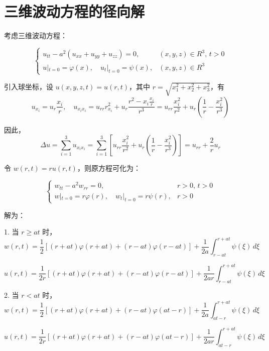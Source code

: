 \section{三维波动方程的径向解}


考虑三维波动方程：

\[
\begin{cases}
u_{tt} - a^2(u_{xx} + u_{yy} + u_{zz}) = 0, & (x, y, z) \in R^3, \, t > 0 \\
u|_{t=0} = \varphi(x), \quad u_t|_{t=0} = \psi(x), & (x, y, z) \in R^3
\end{cases}
\]

引入球坐标，设 $u(x, y, z, t) = u(r, t)$，其中 $r = \sqrt{x_1^2 + x_2^2 + x_3^2}$，有
$$
u_{x_i} = u_r \frac{x_i}{r}, \quad u_{x_ix_i} = u_{rr} r_{x_i}^2 + u_r \frac{r^2 - x_i \frac{x_i}{r}}{r^3} = u_{rr} \frac{x_i^2}{r^2} + u_r \left( \frac{1}{r} - \frac{x_i^2}{r^3} \right)
$$

因此，
$$
\Delta u = \sum_{i=1}^3 u_{x_ix_i} = \sum_{i=1}^3 \left[ u_{rr} \frac{x_i^2}{r^2} + u_r \left( \frac{1}{r} - \frac{x_i^2}{r^3} \right) \right] = u_{rr} + \frac{2}{r} u_r
$$

令 $w(r, t) = r u(r, t)$，则原方程可化为：

\[
\begin{cases}
w_{tt} - a^2 w_{rr} = 0, & r > 0, \, t > 0 \\
w|_{t=0} = r \varphi(r), \quad w_t|_{t=0} = r \psi(r), & r > 0
\end{cases}
\]

解为：

1. 当 $r \geq at$ 时，
   \[
   w(r, t) = \frac{1}{2} \left[ (r+at) \varphi(r+at) + (r-at) \varphi(r-at) \right] + \frac{1}{2a} \int_{r-at}^{r+at} \psi(\xi) \, d\xi
   \]

   \[
   u(r, t) = \frac{1}{2r} \left[ (r+at) \varphi(r+at) + (r-at) \varphi(r-at) \right] + \frac{1}{2ar} \int_{r-at}^{r+at} \psi(\xi) \, d\xi
   \]

2. 当 $r < at$ 时，
   \[
   w(r, t) = \frac{1}{2} \left[ (r+at) \varphi(r+at) + (r-at) \varphi(at - r) \right] + \frac{1}{2a} \int_{at - r}^{r+at} \psi(\xi) \, d\xi
   \]

   \[
   u(r, t) = \frac{1}{2r} \left[ (r+at) \varphi(r+at) + (r-at) \varphi(at - r) \right] + \frac{1}{2ar} \int_{at - r}^{r+at} \psi(\xi) \, d\xi
   \]
